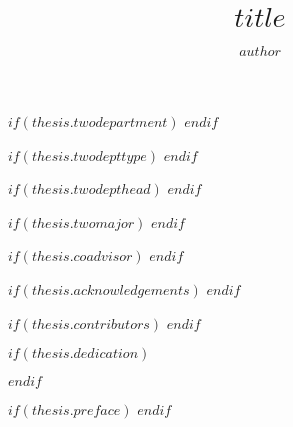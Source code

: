 \title{$title$} %
\author{$author$} %


$if(thesis.twodepartment)$
$endif$

$if(thesis.twodepttype)$
$endif$

$if(thesis.twodepthead)$
$endif$

$if(thesis.twomajor)$
$endif$

$if(thesis.coadvisor)$
$endif$


$if(thesis.acknowledgements)$
$endif$

$if(thesis.contributors)$
$endif$

$if(thesis.dedication)$
	\dedication{$thesis.dedication$}
$endif$

$if(thesis.preface)$
$endif$